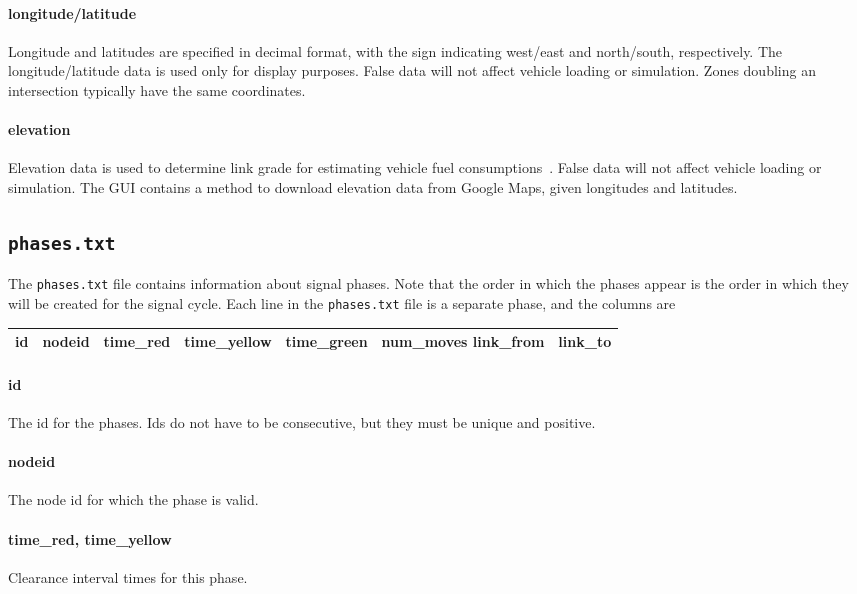 \paragraph*{longitude/latitude}
Longitude and latitudes are specified in decimal format, with the sign indicating west/east and north/south, respectively. The longitude/latitude data is used only for display purposes. False data will not affect vehicle loading or simulation. Zones doubling an intersection typically have the same coordinates.

\paragraph*{elevation}
Elevation data is used to determine link grade for estimating vehicle fuel consumptions~\cite{levin2014effect}. False data will not affect vehicle loading or simulation. The GUI contains a method to download elevation data from Google Maps, given longitudes and latitudes.

\subsection{\texttt{phases.txt}}
The \texttt{phases.txt} file contains information about signal phases. Note that the order in which the phases appear is the order in which they will be created for the signal cycle. Each line in the \texttt{phases.txt} file is a separate phase, and the columns are
\begin{center}
\begin{tabular}{ccccccc}
\hline
id & nodeid & time\_red & time\_yellow & time\_green & num\_moves	link\_from & link\_to\\\hline
\end{tabular}
\end{center}
\paragraph*{id} The id for the phases. Ids do not have to be consecutive, but they must be unique and positive.
\paragraph*{nodeid} The node id for which the phase is valid.
\paragraph*{time\_red, time\_yellow} Clearance interval times for this phase.
